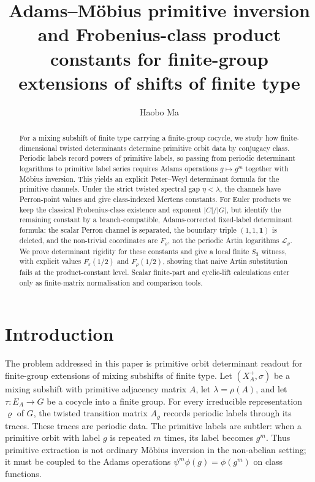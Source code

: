 \documentclass[11pt,a4paper]{amsart}
\title[Finite-group SFT extensions and product constants]{Adams--M\"obius primitive inversion and Frobenius-class product constants for finite-group extensions of shifts of finite type}
\author[Haobo Ma]{Haobo Ma}
\date{}
\theoremstyle{plain}
\theoremstyle{definition}
\theoremstyle{remark}
\begin{document}
\begin{abstract}
For a mixing subshift of finite type carrying a finite-group cocycle, we
study how finite-dimensional twisted determinants determine primitive orbit
data by conjugacy class.  Periodic labels record powers of primitive labels,
so passing from periodic determinant logarithms to primitive label series
requires Adams operations \(g\mapsto g^m\) together with M\"obius
inversion.  This yields an explicit Peter--Weyl determinant formula for the
primitive channels.  Under the strict twisted spectral gap
\(\eta<\lambda\), the channels have Perron-point values and give
class-indexed Mertens constants.  For Euler products we keep the classical
Frobenius-class existence and exponent \(|C|/|G|\), but identify the remaining
constant by a branch-compatible, Adams-corrected fixed-label determinant
formula: the scalar Perron channel is separated, the boundary triple
\((1,1,\mathbf1)\) is deleted, and the non-trivial coordinates are
\(F_\varrho\), not the periodic Artin logarithms \(\mathcal L_\varrho\).
We prove determinant rigidity for these constants and give a local finite
\(S_3\) witness, with explicit values \(F_\varepsilon(1/2)\) and
\(F_\rho(1/2)\), showing that naive Artin substitution fails at the
product-constant level.  Scalar finite-part and cyclic-lift calculations enter
only as finite-matrix normalisation and comparison tools.
\end{abstract}


\maketitle

\section{Introduction}\label{sec:introduction}

The problem addressed in this paper is primitive orbit determinant readout
for finite-group extensions of mixing subshifts of finite type. Let
\((X_A^+,\sigma)\) be a mixing subshift with primitive adjacency matrix
\(A\), let \(\lambda=\rho(A)\), and let \(\tau:E_A\to G\) be a cocycle
into a finite group. For every irreducible representation \(\varrho\)
of \(G\), the twisted transition matrix \(A_\varrho\) records periodic
labels through its traces. These traces are periodic data. The
primitive labels are subtler: when a primitive orbit with label \(g\)
is repeated \(m\) times, its label becomes \(g^m\). Thus primitive
extraction is not ordinary M\"obius inversion in the non-abelian
setting; it must be coupled to the Adams operations
\(\psi^m\phi(g)=\phi(g^m)\) on class functions.
\end{document}
